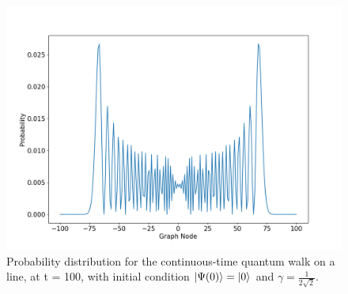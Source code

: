                 \begin{figure}[!h]
                    \centering
                    \includegraphics[scale=0.40]{img/ContQW/ctqwSinglePsi0.png}
                    \caption{Probability distribution for the continuous-time quantum walk on a line, at t = 100, with initial condition $\ket{\Psi(0)}=\ket{0}$ and $\gamma=\frac{1}{2\sqrt{2}}$.} 
                    \label{fig:contdist0}
                \end{figure}
                
